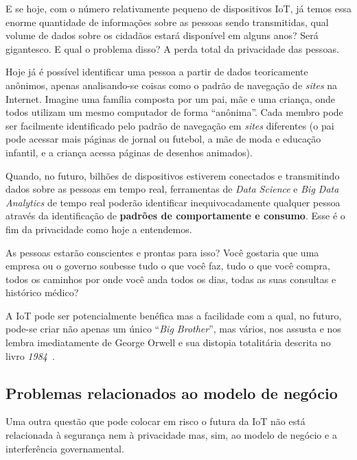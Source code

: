 \documentclass[pdftex, brazil, 12pt, twoside]{article}
\newcommand{\ingles}[1]{\textit{#1}}
\begin{document}
E se hoje, com o número relativamente pequeno de dispositivos IoT, já temos
essa enorme quantidade de informações sobre as pessoas sendo transmitidas,
qual volume de dados sobre os cidadãos estará disponível em alguns anos?
Será gigantesco. E qual o problema disso? A perda total da privacidade das pessoas.

Hoje já é possível identificar uma pessoa a partir de dados teoricamente anônimos,
apenas analisando-se coisas como o padrão de navegação de \ingles{sites} na Internet.
Imagine uma família composta por um pai, mãe e uma criança, onde todos utilizam
um mesmo computador de forma ``anônima''. Cada membro pode ser facilmente identificado
pelo padrão de navegação em \ingles{sites} diferentes (o pai pode acessar mais páginas
de jornal ou futebol, a mãe de moda e educação infantil,
e a criança acessa páginas de desenhos animados).

Quando, no futuro, bilhões de dispositivos estiverem conectados e transmitindo
dados sobre as pessoas em tempo real, ferramentas de \ingles{Data Science} e
\ingles{Big Data Analytics} de tempo real poderão identificar inequivocadamente
qualquer pessoa através da identificação de \textbf{padrões de comportamente e consumo}.
Esse é o fim da privacidade como hoje a entendemos.

As pessoas estarão conscientes e prontas para isso? Você gostaria que uma
empresa ou o governo soubesse tudo o que você faz, tudo o que você compra,
todos os caminhos por onde você anda todos os dias, todas as suas consultas
e histórico médico?

A IoT pode ser potencialmente benéfica mas a facilidade com a qual, no futuro,
pode-se criar não apenas um único ``\ingles{Big Brother}'', mas vários,
nos assusta e nos lembra imediatamente de George Orwell e sua distopia
totalitária descrita no livro \emph{1984}~\citep{Orwell1984}.


\subsection{Problemas relacionados ao modelo de negócio}
\label{perigos-iot-modelo-negocio}

Uma outra questão que pode colocar em risco o futura da IoT não está relacionada
à segurança nem à privacidade mas, sim, ao modelo de negócio e a interferência governamental.
\end{document}
